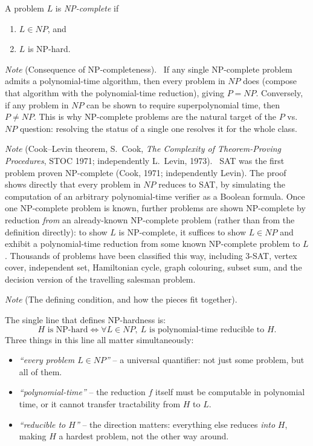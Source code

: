 \documentclass[11pt]{article}
\begin{document}
\begin{definition}
A problem $L$ is \emph{NP-complete} if
\begin{enumerate}
\item $L\in NP$, and
\item $L$ is NP-hard.
\end{enumerate}
\end{definition}

\textit{Note} (Consequence of NP-completeness). \ If any single NP-complete problem admits a polynomial-time algorithm, then every problem in $NP$ does (compose that algorithm with the polynomial-time reduction), giving $P=NP$. Conversely, if any problem in $NP$ can be shown to require superpolynomial time, then $P\ne NP$. This is why NP-complete problems are the natural target of the $P$ vs.\ $NP$ question: resolving the status of a single one resolves it for the whole class.

\textit{Note} (Cook--Levin theorem, S.\ Cook, \textit{The Complexity of Theorem-Proving Procedures}, STOC 1971; independently L.\ Levin, 1973). \ SAT was the first problem proven NP-complete (Cook, 1971; independently Levin). The proof shows directly that every problem in $NP$ reduces to SAT, by simulating the computation of an arbitrary polynomial-time verifier as a Boolean formula. Once one NP-complete problem is known, further problems are shown NP-complete by reduction \emph{from} an already-known NP-complete problem (rather than from the definition directly): to show $L$ is NP-complete, it suffices to show $L\in NP$ and exhibit a polynomial-time reduction from some known NP-complete problem to $L$. Thousands of problems have been classified this way, including 3-SAT, vertex cover, independent set, Hamiltonian cycle, graph colouring, subset sum, and the decision version of the travelling salesman problem.

\textit{Note} (The defining condition, and how the pieces fit together).

\smallskip
\noindent The single line that defines NP-hardness is:
\[
H\text{ is NP-hard} \iff \forall L\in NP,\ L\text{ is polynomial-time reducible to } H.
\]
Three things in this line all matter simultaneously:
\begin{itemize}
\item \emph{``every problem $L\in NP$''} -- a universal quantifier: not just some problem, but all of them.
\item \emph{``polynomial-time''} -- the reduction $f$ itself must be computable in polynomial time, or it cannot transfer tractability from $H$ to $L$.
\item \emph{``reducible to $H$''} -- the direction matters: everything else reduces \emph{into} $H$, making $H$ a hardest problem, not the other way around.
\end{itemize}
\end{document}
